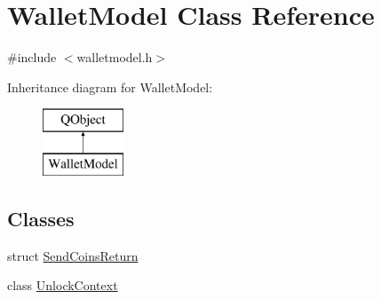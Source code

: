 \hypertarget{class_wallet_model}{}\section{Wallet\+Model Class Reference}
\label{class_wallet_model}


{\ttfamily \#include $<$walletmodel.\+h$>$}

Inheritance diagram for Wallet\+Model\+:\begin{figure}[H]
\begin{center}
\leavevmode
\includegraphics[height=2.000000cm]{class_wallet_model}
\end{center}
\end{figure}
\subsection*{Classes}
\begin{DoxyCompactItemize}
\item 
struct \hyperlink{struct_wallet_model_1_1_send_coins_return}{Send\+Coins\+Return}
\item 
class \hyperlink{class_wallet_model_1_1_unlock_context}{Unlock\+Context}
\end{DoxyCompactItemize}
